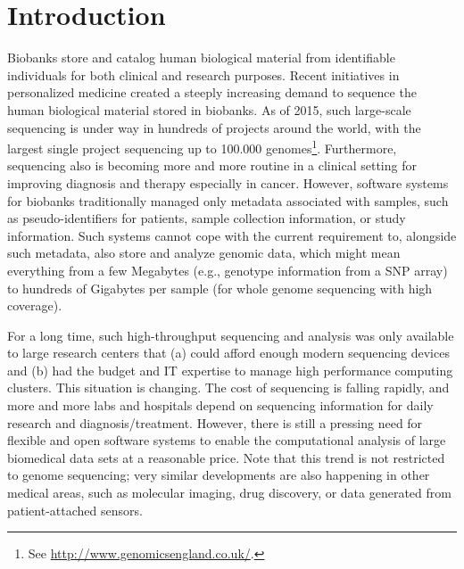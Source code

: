 
\section{Introduction}
Biobanks store and catalog human biological material from identifiable individuals for both clinical and research purposes. Recent initiatives in personalized medicine created a steeply increasing demand to sequence the human biological material stored in biobanks. As of 2015, such large-scale sequencing is under way in hundreds of projects around the world, with the largest single project sequencing up to 100.000 genomes\footnote{See \url{http://www.genomicsengland.co.uk/}.}. Furthermore, sequencing also is becoming more and more routine in a clinical setting for improving diagnosis and therapy especially in cancer\cite{pmedicine}. However, software systems for biobanks traditionally managed only metadata associated with samples, such as pseudo-identifiers for patients, sample collection information, or study information. Such systems cannot cope with the current requirement to, alongside such metadata, also store and analyze genomic data, which might mean everything from a few Megabytes (e.g., genotype information from a SNP array) to hundreds of Gigabytes per sample (for whole genome sequencing with high coverage). 

For a long time, such high-throughput sequencing and analysis was only available to large research centers that (a) could afford enough modern sequencing devices and (b) had the budget and IT expertise to manage high performance computing clusters. This situation is changing. The cost of sequencing is falling rapidly, and more and more labs and hospitals depend on sequencing information for daily research and diagnosis/treatment. However, there is still a pressing need for flexible and open software systems to enable the computational analysis of large biomedical data sets at a reasonable price. Note that this trend is not restricted to genome sequencing; very similar developments are also happening in other medical areas, such as molecular imaging\cite{imaging}, drug discovery\cite{drug}, or data generated from patient-attached sensors\cite{qself}. 

